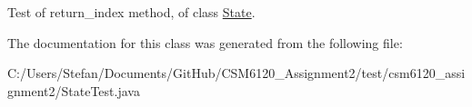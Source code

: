 Test of return\+\_\+index method, of class \hyperlink{classcsm6120__assignment2_1_1_state}{State}. 

The documentation for this class was generated from the following file\+:\begin{DoxyCompactItemize}
\item 
C\+:/\+Users/\+Stefan/\+Documents/\+Git\+Hub/\+C\+S\+M6120\+\_\+\+Assignment2/test/csm6120\+\_\+assignment2/State\+Test.\+java\end{DoxyCompactItemize}
